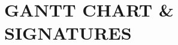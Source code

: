 \documentclass[letterpaper, 10pt, draftclsnofoot, compsoc, onecolumn]{IEEEtran}
\begin{document}

\clearpage
\section[GANTT CHART/SIGNATURES]{\rmfamily\bfseries\color{black}
GANTT CHART \& SIGNATURES}

\end{document}
